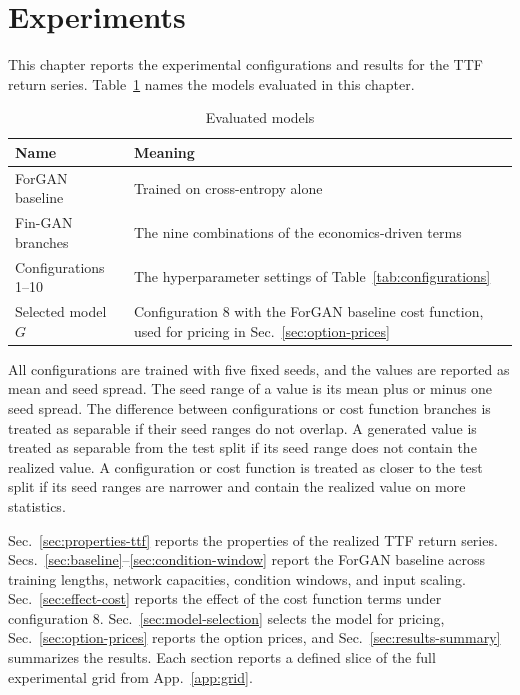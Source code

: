 \section{Experiments}\label{sec:exp}

This chapter reports the experimental configurations and results for the TTF return series. Table~\ref{tab:models} names the models evaluated in this chapter.

\begin{table}[H]
  \centering
  \begin{tabular}{lp{}}
    \toprule
    Name & Meaning \\
    \midrule
    ForGAN baseline &
      Trained on cross-entropy alone \\
    Fin-GAN branches &
      The nine combinations of the
      economics-driven terms \\
    Configurations 1--10 &
      The hyperparameter settings of
      Table~\ref{tab:configurations} \\
    Selected model $G$ &
      Configuration 8 with the ForGAN
      baseline cost function, used for
      pricing in
      Sec.~\ref{sec:option-prices} \\
    \bottomrule
  \end{tabular}
  \caption{Evaluated models}
  \label{tab:models}
\end{table}

All configurations are trained with five fixed seeds, and the values are reported as mean and seed spread. The seed range of a value is its mean plus or minus one seed spread. The difference between configurations or cost function branches is treated as separable if their seed ranges do not overlap. A generated value is treated as separable from the test split if its seed range does not contain the realized value. A configuration or cost function is treated as closer to the test split if its seed ranges are narrower and contain the realized value on more statistics.

Sec.~\ref{sec:properties-ttf} reports the properties of the realized TTF return series. Secs.~\ref{sec:baseline}--\ref{sec:condition-window} report the ForGAN baseline across training lengths, network capacities, condition windows, and input scaling. Sec.~\ref{sec:effect-cost} reports the effect of the cost function terms under configuration 8. Sec.~\ref{sec:model-selection} selects the model for pricing, Sec.~\ref{sec:option-prices} reports the option prices, and Sec.~\ref{sec:results-summary} summarizes the results. Each section reports a defined slice of the full experimental grid from App.~\ref{app:grid}.










